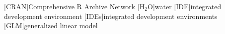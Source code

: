 %
%
%
%
%
%
%
%
%
%
%
%
%
%
%
%
[CRAN]{Comprehensive R Archive Network}
[$\mathrm{H_2O}$]{water}
[IDE]{integrated development environment}
[IDEs]{integrated development environments}
[GLM]{generalized linear model}
